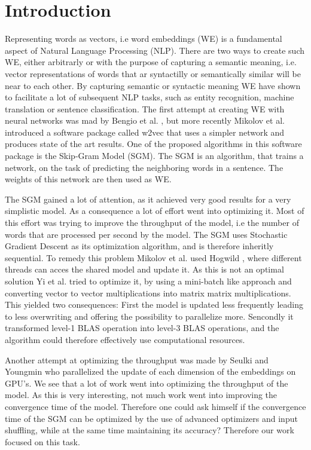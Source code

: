\chapter{Introduction}\label{chap:introduction}

Representing words as vectors, i.e word embeddings (WE) is a fundamental aspect of Natural Language Processing (NLP). There are two ways to create such WE, either arbitrarly or with the purpose of capturing a semantic meaning, i.e. vector representations of words that ar syntactilly or semantically similar will be near to each other. By capturing semantic or syntactic meaning WE have shown to facilitate a lot of subsequent NLP tasks, such as entity recognition, machine translation or sentence classification.  The first attempt at creating WE with neural networks was mad by Bengio et al. \cite{bengio}, but more recently Mikolov et al. \cite{mikolov} introduced a software package called w2vec that uses a simpler network and produces state of the art results. One of the proposed algorithms in this software package is the Skip-Gram Model (SGM). The SGM is an algorithm, that trains a network, on the task of predicting the neighboring words in a sentence. The weights of this network are then used as WE. 

The SGM gained a lot of attention, as it achieved very good results for a very simplistic model. As a consequence a lot of effort went into optimizing  it. Most of this effort was trying to improve the throughput of the model, i.e the number of words that are processed per second by the model. The SGM uses Stochastic Gradient Descent as its optimization algorithm, and is therefore inheritly sequential. To remedy this problem Mikolov et al. used Hogwild \cite{hogwild}, where different threads can acces the shared model and update it. As this is not an optimal solution Yi et al. \cite{intel} tried to optimize it, by using a mini-batch like approach and converting vector to vector multiplications into matrix matrix multiplications. This yielded two consequences: First the model is updated less frequently leading to less overwriting and offering the possibility to parallelize more. Sencondly it transformed level-1 BLAS operation into level-3 BLAS operations, and the algorithm could therefore effectively use computational resources.

Another attempt at optimizing the throughput was made by Seulki and Youngmin \cite{gpu} who parallelized the update of each dimension of the embeddings on GPU's. We see that a lot of work went into optimizing the throughput of the model. As this is very interesting, not much work went into improving the convergence time of the model. Therefore one could ask himself if the convergence time of the SGM can be optimized by the use of advanced optimizers and input shuffling, while at the same time maintaining its accuracy?  Therefore our work focused on this task.\\

